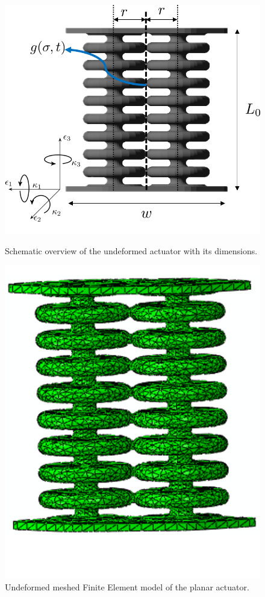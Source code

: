 \begin{figure}[H] 
    \begin{minipage}[b]{0.49\linewidth}
     \centering
    \includegraphics[width=\linewidth]{Figures/Chapter3/dimensions.png} 
    \caption{Schematic overview of the undeformed actuator with its dimensions.} 
    \label{fig3:dim} 
       \end{minipage} 
    \begin{minipage}[b]{0.49\linewidth}
     \centering
    \includegraphics[width=0.7\linewidth]{Figures/Chapter3/undeformed2.png} 
    \caption{Undeformed meshed Finite Element model of the planar actuator.} 
    \label{fig3:FemModel} 
    \end{minipage} 
\end{figure}

